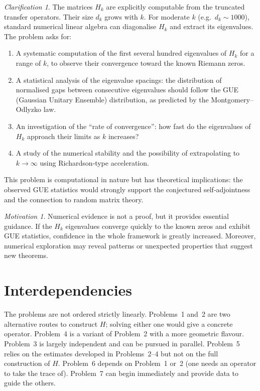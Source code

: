 \documentclass[11pt,a4paper]{article}
\theoremstyle{remark}
\newtheorem{clarification}[problem]{Clarification}
\newtheorem{motivation}[problem]{Motivation}
\begin{document}
\begin{clarification}
The matrices $H_k$ are explicitly computable from the truncated transfer operators. Their size $d_k$ grows with $k$. For moderate $k$ (e.g.\ $d_k\sim 1000$), standard numerical linear algebra can diagonalise $H_k$ and extract its eigenvalues. The problem asks for:
\begin{enumerate}
    \item A systematic computation of the first several hundred eigenvalues of $H_k$ for a range of $k$, to observe their convergence toward the known Riemann zeros.
    \item A statistical analysis of the eigenvalue spacings: the distribution of normalised gaps between consecutive eigenvalues should follow the GUE (Gaussian Unitary Ensemble) distribution, as predicted by the Montgomery--Odlyzko law.
    \item An investigation of the ``rate of convergence'': how fast do the eigenvalues of $H_k$ approach their limits as $k$ increases?
    \item A study of the numerical stability and the possibility of extrapolating to $k\to\infty$ using Richardson‑type acceleration.
\end{enumerate}
This problem is computational in nature but has theoretical implications: the observed GUE statistics would strongly support the conjectured self‑adjointness and the connection to random matrix theory.
\end{clarification}

\begin{motivation}
Numerical evidence is not a proof, but it provides essential guidance. If the $H_k$ eigenvalues converge quickly to the known zeros and exhibit GUE statistics, confidence in the whole framework is greatly increased. Moreover, numerical exploration may reveal patterns or unexpected properties that suggest new theorems.
\end{motivation}

\section{Interdependencies}
The problems are not ordered strictly linearly. Problems~1 and~2 are two alternative routes to construct $H$; solving either one would give a concrete operator. Problem~4 is a variant of Problem~2 with a more geometric flavour. Problem~3 is largely independent and can be pursued in parallel. Problem~5 relies on the estimates developed in Problems~2--4 but not on the full construction of $H$. Problem~6 depends on Problem~1 or~2 (one needs an operator to take the trace of). Problem~7 can begin immediately and provide data to guide the others.
\end{document}

